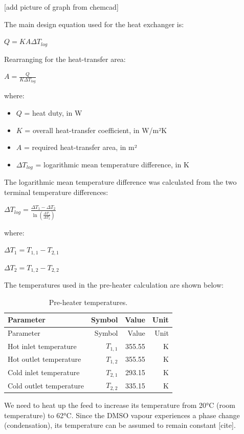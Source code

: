 {[}add picture of graph from chemcad{]}

The main design equation used for the heat exchanger is:

\(Q = K A \Delta T_{log}\)

Rearranging for the heat-transfer area:

\(A = \frac{Q}{K \Delta T_{log}}\)

where:

\begin{itemize}
\tightlist
\item
  \(Q\) = heat duty, in W
\item
  \(K\) = overall heat-transfer coefficient, in W/m²K
\item
  \(A\) = required heat-transfer area, in m²
\item
  \(\Delta T_{log}\) = logarithmic mean temperature difference, in K
\end{itemize}

The logarithmic mean temperature difference was calculated from the two
terminal temperature differences:

\(\Delta T_{log} = \frac{\Delta T_1 - \Delta T_2}{\ln \left(\frac{\Delta T_1}{\Delta T_2}\right)}\)

where:

\(\Delta T_1 = T_{1,1} - T_{2,1}\)

\(\Delta T_2 = T_{1,2} - T_{2,2}\)

The temperatures used in the pre-heater calculation are shown below:

\begin{longtable}[]{@{}lrrr@{}}
\caption{Pre-heater temperatures.
\label{tab:Pre-heater temperatures}}\tabularnewline
\toprule\noalign{}
Parameter & Symbol & Value & Unit \\
\midrule\noalign{}
\endfirsthead
\toprule\noalign{}
Parameter & Symbol & Value & Unit \\
\midrule\noalign{}
\endhead
\bottomrule\noalign{}
\endlastfoot
Hot inlet temperature & \(T_{1,1}\) & 355.55 & K \\
Hot outlet temperature & \(T_{1,2}\) & 355.55 & K \\
Cold inlet temperature & \(T_{2,1}\) & 293.15 & K \\
Cold outlet temperature & \(T_{2,2}\) & 335.15 & K \\
\end{longtable}

We need to heat up the feed to increase its temperature from 20°C (room
temperature) to 62°C. Since the DMSO vapour experiences a phase change
(condensation), its temperature can be assumed to remain constant
{[}cite{]}.

